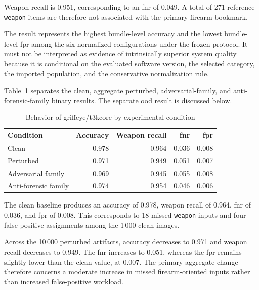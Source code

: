 Weapon recall is 0.951, corresponding to an \gls{fnr} of 0.049. A total of
271 reference \texttt{weapon} items are therefore not associated with the
primary firearm bookmark.

The result represents the highest bundle-level accuracy and the lowest
bundle-level \gls{fpr} among the six normalized configurations under the
frozen protocol. It must not be interpreted as evidence of intrinsically
superior system quality because it is conditional on the evaluated software
version, the selected category, the imported population, and the conservative
normalization rule.

Table~\ref{tab:results-griffeye-condition-metrics} separates the clean,
aggregate perturbed, adversarial-family, and anti-forensic-family binary
results. The separate \gls{ood} result is discussed below.

\begin{table}[H]
\centering
\caption{Behavior of \gls{griffeye}/\gls{t3kcore} by experimental condition}
\label{tab:results-griffeye-condition-metrics}
\small
\renewcommand{\arraystretch}{1.15}
\begin{tabular}{@{}lrrrr@{}}
\toprule
\textbf{Condition} &
\textbf{Accuracy} &
\textbf{Weapon recall} &
\textbf{\gls{fnr}} &
\textbf{\gls{fpr}} \\
\midrule

Clean
&
0.978
&
0.964
&
0.036
&
0.008 \\

Perturbed
&
0.971
&
0.949
&
0.051
&
0.007 \\

Adversarial family
&
0.969
&
0.945
&
0.055
&
0.008 \\

Anti-forensic family
&
0.974
&
0.954
&
0.046
&
0.006 \\

\bottomrule
\end{tabular}
\end{table}

The clean baseline produces an accuracy of 0.978, weapon recall of 0.964,
\gls{fnr} of 0.036, and \gls{fpr} of 0.008. This corresponds to 18 missed
\texttt{weapon} inputs and four false-positive assignments among the 1\,000
clean images.

Across the 10\,000 perturbed artifacts, accuracy decreases to 0.971 and weapon
recall decreases to 0.949. The \gls{fnr} increases to 0.051, whereas the
\gls{fpr} remains slightly lower than the clean value, at 0.007. The primary
aggregate change therefore concerns a moderate increase in missed
firearm-oriented inputs rather than increased false-positive workload.

